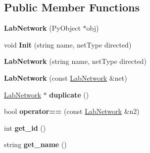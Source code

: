 \subsection*{Public Member Functions}
\begin{DoxyCompactItemize}
\item 
\hypertarget{classelps_1_1_lab_network_aeb15a92d601340781b5d9b265b58e7cb}{{\bfseries Lab\+Network} (Py\+Object $\ast$obj)}\label{classelps_1_1_lab_network_aeb15a92d601340781b5d9b265b58e7cb}

\item 
\hypertarget{classelps_1_1_lab_network_a27bf64f9378313b9533201daf70fa8d2}{void {\bfseries Init} (string name, net\+Type directed)}\label{classelps_1_1_lab_network_a27bf64f9378313b9533201daf70fa8d2}

\item 
\hypertarget{classelps_1_1_lab_network_aa16dcd790f67390e9f8038b7c67c97a5}{{\bfseries Lab\+Network} (string name, net\+Type directed)}\label{classelps_1_1_lab_network_aa16dcd790f67390e9f8038b7c67c97a5}

\item 
\hypertarget{classelps_1_1_lab_network_a9b8166a889554be6ef11642ee43a15f2}{{\bfseries Lab\+Network} (const \hyperlink{classelps_1_1_lab_network}{Lab\+Network} \&net)}\label{classelps_1_1_lab_network_a9b8166a889554be6ef11642ee43a15f2}

\item 
\hypertarget{classelps_1_1_lab_network_a91b9f6a674fffdeb4cb759596ef705b7}{\hyperlink{classelps_1_1_lab_network}{Lab\+Network} $\ast$ {\bfseries duplicate} ()}\label{classelps_1_1_lab_network_a91b9f6a674fffdeb4cb759596ef705b7}

\item 
\hypertarget{classelps_1_1_lab_network_a0d0e7a6d08d9503521377e906f88a97e}{bool {\bfseries operator==} (const \hyperlink{classelps_1_1_lab_network}{Lab\+Network} \&n2)}\label{classelps_1_1_lab_network_a0d0e7a6d08d9503521377e906f88a97e}

\item 
\hypertarget{classelps_1_1_lab_network_ac01befb26e5377313fceeaa0da1fb760}{int {\bfseries get\+\_\+id} ()}\label{classelps_1_1_lab_network_ac01befb26e5377313fceeaa0da1fb760}

\item 
\hypertarget{classelps_1_1_lab_network_a5fe226eca7093ffca9c599a7470af7b0}{string {\bfseries get\+\_\+name} ()}\label{classelps_1_1_lab_network_a5fe226eca7093ffca9c599a7470af7b0}


\end{DoxyCompactItemize}
